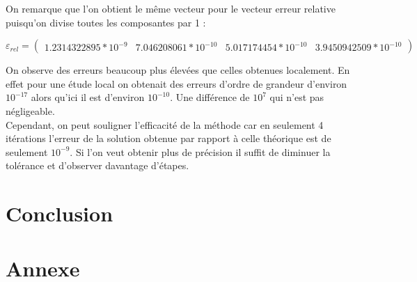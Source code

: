 \documentclass[12,french]{report}
\begin{document}
On remarque que l'on obtient le même vecteur pour le vecteur erreur relative puisqu'on divise toutes les composantes par 1 :

$$\varepsilon_{rel}=\left(\begin{array}{cccc}
1.2314322895*10^{-9} & 7.046208061*10^{-10} & 5.017174454*10^{-10} & 3.9450942509*10^{-10} \end{array}\right)$$

On observe des erreurs beaucoup plus élevées que celles obtenues localement. En effet pour une étude local on obtenait des erreurs d'ordre de grandeur d'environ $10^{-17}$ alors qu'ici il est d'environ $10^{-10}$. Une différence de $10^{7}$ qui n'est pas négligeable.\\

Cependant, on peut souligner l'efficacité de la méthode car en seulement 4 itérations l'erreur de la solution obtenue par rapport à celle théorique est de seulement $10^{-9}$. Si l'on veut obtenir plus de précision il suffit de diminuer la tolérance et d'observer davantage d'étapes.





\chapter*{Conclusion} %

\chapter*{Annexe}
\end{document}
